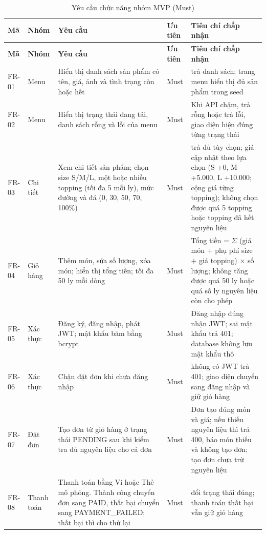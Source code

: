 {\small
\begin{longtable}{@{}L{1.2cm}L{1.6cm}L{4.9cm}L{1.3cm}L{4.9cm}@{}}
\caption{Yêu cầu chức năng nhóm MVP (Must)}\label{tab:frmvp}\\
\toprule
\textbf{Mã} & \textbf{Nhóm} & \textbf{Yêu cầu} & \textbf{Ưu tiên} & \textbf{Tiêu chí chấp nhận} \\ \midrule \endfirsthead
\toprule \textbf{Mã} & \textbf{Nhóm} & \textbf{Yêu cầu} & \textbf{Ưu tiên} & \textbf{Tiêu chí chấp nhận} \\ \midrule \endhead
\bottomrule \endfoot
FR-01 & Menu & Hiển thị danh sách sản phẩm có tên, giá, ảnh và tình trạng còn hoặc hết & Must &  trả danh sách; trang menu hiển thị đủ sản phẩm trong seed \\
FR-02 & Menu & Hiển thị trạng thái đang tải, danh sách rỗng và lỗi của menu & Must & Khi API chậm, trả rỗng hoặc trả lỗi, giao diện hiện đúng từng trạng thái \\
FR-03 & Chi tiết & Xem chi tiết sản phẩm; chọn size S/M/L, một hoặc nhiều topping (tối đa 5 mỗi ly), mức đường và đá (0, 30, 50, 70, 100\%) & Must &  trả đủ tùy chọn; giá cập nhật theo lựa chọn (S +0, M +5.000, L +10.000; cộng giá từng topping); không chọn được quá 5 topping hoặc topping đã hết nguyên liệu \\
FR-04 & Giỏ hàng & Thêm món, sửa số lượng, xóa món; hiển thị tổng tiền; tối đa 50 ly mỗi dòng & Must & Tổng tiền = $\Sigma$ (giá món + phụ phí size + giá topping) $\times$ số lượng; không tăng được quá 50 ly hoặc quá số ly nguyên liệu còn cho phép \\
FR-05 & Xác thực & Đăng ký, đăng nhập, phát JWT; mật khẩu băm bằng bcrypt & Must & Đăng nhập đúng nhận JWT; sai mật khẩu trả 401; database không lưu mật khẩu thô \\
FR-06 & Xác thực & Chặn đặt đơn khi chưa đăng nhập & Must &  không có JWT trả 401; giao diện chuyển sang đăng nhập và giữ giỏ hàng \\
FR-07 & Đặt đơn & Tạo đơn từ giỏ hàng ở trạng thái PENDING sau khi kiểm tra đủ nguyên liệu cho cả đơn & Must & Đơn tạo đúng món và giá; nếu thiếu nguyên liệu thì trả 400, báo món thiếu và không tạo đơn; tạo đơn chưa trừ nguyên liệu \\
FR-08 & Thanh toán & Thanh toán bằng Ví hoặc Thẻ mô phỏng. Thành công chuyển đơn sang PAID, thất bại chuyển sang PAYMENT\_FAILED; thất bại thì cho thử lại & Must &  đổi trạng thái đúng; thanh toán thất bại vẫn giữ giỏ hàng \\

\end{longtable}}
